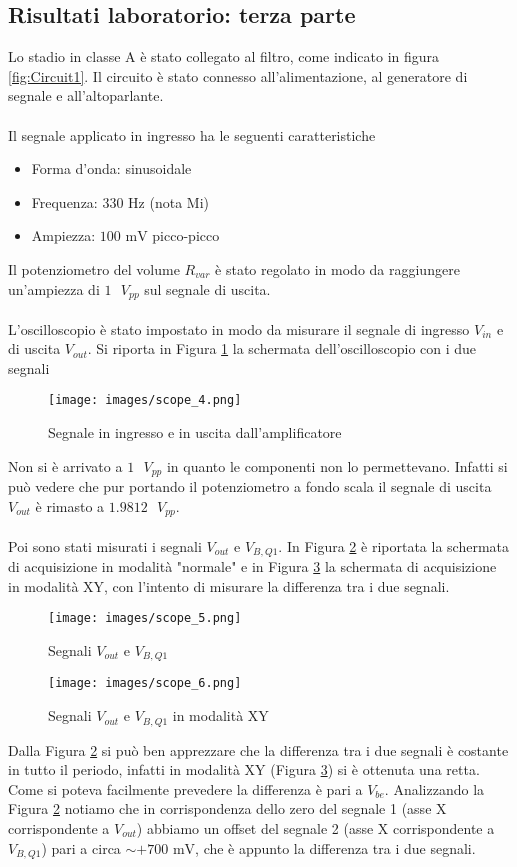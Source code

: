 \subsection{Risultati laboratorio: terza parte}
Lo stadio in classe A è stato collegato al filtro, come indicato in figura \ref{fig:Circuit1}. Il circuito è stato connesso all'alimentazione, al generatore di segnale e all'altoparlante.\\\\
Il segnale applicato in ingresso ha le seguenti caratteristiche
\begin{itemize}
    \item Forma d'onda: sinusoidale
    \item Frequenza: 330 Hz (nota Mi)
    \item Ampiezza: $100\text{ mV}$ picco-picco
\end{itemize}
Il potenziometro del volume $R_{var}$ è stato regolato in modo da raggiungere un'ampiezza di $1\text{ } V_{pp}$ sul segnale di uscita.\\\\
L'oscilloscopio è stato impostato in modo da misurare il segnale di ingresso $V_{in}$ e di uscita $V_{out}$. Si riporta in Figura \ref{fig:scope_4} la schermata dell'oscilloscopio con i due segnali
\begin{figure}[H]
    \centering
    \texttt{[image: images/scope\_4.png]}
    \caption{Segnale in ingresso e in uscita dall'amplificatore}
    \label{fig:scope_4}
\end{figure}
Non si è arrivato a $1\text{ } V_{pp}$ in quanto le componenti non lo permettevano. Infatti si può vedere che pur portando il potenziometro a fondo scala il segnale di uscita $V_{out}$ è rimasto a $1.9812\text{ } V_{pp}$.\\\\
Poi sono stati misurati i segnali $V_{out} \text{ e } V_{B,Q1}$. In Figura \ref{fig:scope_5} è riportata la schermata di acquisizione in modalità "normale" e in Figura \ref{fig:scope_6} la schermata di acquisizione in modalità XY, con l'intento di misurare la differenza tra i due segnali.
\begin{figure}[H]
    \centering
    \texttt{[image: images/scope\_5.png]}
    \caption{Segnali $V_{out} \text{ e } V_{B,Q1}$}
    \label{fig:scope_5}
\end{figure}
\begin{figure}[H]
    \centering
    \texttt{[image: images/scope\_6.png]}
    \caption{Segnali $V_{out} \text{ e } V_{B,Q1}$ in modalità XY}
    \label{fig:scope_6}
\end{figure}
Dalla Figura \ref{fig:scope_5} si può ben apprezzare che la differenza tra i due segnali è costante in tutto il periodo, infatti in modalità XY (Figura \ref{fig:scope_6}) si è ottenuta una retta. Come si poteva facilmente prevedere la differenza è pari a $V_{be}$. Analizzando la Figura \ref{fig:scope_5} notiamo che in corrispondenza dello zero del segnale 1 (asse X corrispondente a $V_{out}$) abbiamo un offset del segnale 2 (asse X corrispondente a $V_{B,Q1}$) pari a circa $\sim +700\text{ mV}$, che è appunto la differenza tra i due segnali.
